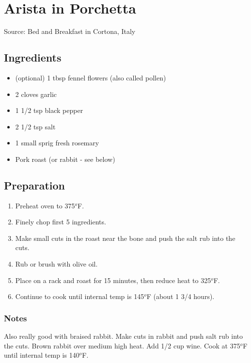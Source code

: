 \section{Arista in Porchetta}

\begin{center}
Source: Bed and Breakfast in Cortona, Italy
\end{center}

\subsection{Ingredients}
\begin{multicols}{2}
\begin{itemize}
    \item (optional) 1 tbsp fennel flowers (also called pollen)
    \item 2 cloves garlic
    \item 1 1/2 tsp black pepper
    \item 2 1/2 tsp salt
    \item 1 small sprig fresh rosemary
    \item Pork roast (or rabbit - see below)
\end{itemize}
\end{multicols}

\subsection{Preparation}
\begin{enumerate}
    \item Preheat oven to 375$^o$F.
    \item Finely chop first 5 ingredients.
    \item Make small cuts in the roast near the bone and push the salt rub into the cuts.
    \item Rub or brush with olive oil.
    \item Place on a rack and roast for 15 minutes, then reduce heat to 325$^o$F.
    \item Continue to cook until internal temp is 145$^o$F (about 1 3/4 hours).
\end{enumerate}

\subsubsection{Notes}
Also really good with braised rabbit.
Make cuts in rabbit and push salt rub into the cuts.
Brown rabbit over medium high heat.
Add 1/2 cup wine.
Cook at 375$^o$F until internal temp is 140$^o$F.

